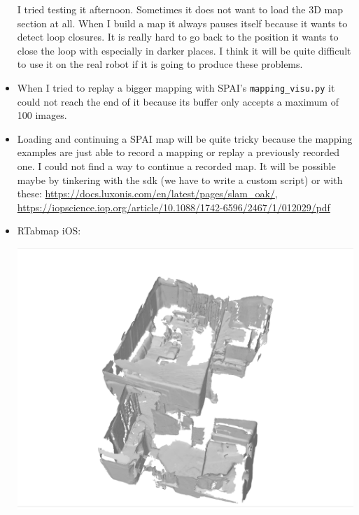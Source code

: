 \documentclass{article}
\begin{document}
\begin{itemize}
\begin{minipage}{\linewidth}
    \end{minipage}\par
    I tried testing it afternoon. Sometimes it does not want to load the 3D map section at all. When I build a map it always pauses itself because it wants to detect loop closures. It is really hard to go back to the position it wants to close the loop with especially in darker places. I think it will be quite difficult to use it on the real robot if it is going to produce these problems.

    \item When I tried to replay a bigger mapping with SPAI's \verb|mapping_visu.py| it could not reach the end of it because its buffer only accepts a maximum of 100 images.
    \item Loading and continuing a SPAI map will be quite tricky because the mapping examples are just able to record a mapping or replay a previously recorded one. I could not find a way to continue a recorded map. It will be possible maybe by tinkering with the sdk (we have to write a custom script) or with these: \url{https://docs.luxonis.com/en/latest/pages/slam_oak/}, \url{https://iopscience.iop.org/article/10.1088/1742-6596/2467/1/012029/pdf}
    \item RTabmap iOS:\par
    \begin{minipage}{\linewidth}
        \centering
        \includegraphics[width=1\linewidth]{images/rtabmap_ios.png}
    \end{minipage}\par


\end{itemize}
\end{document}
